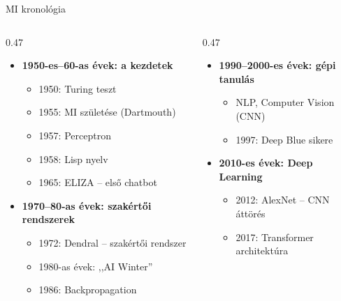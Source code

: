 \documentclass[aspectratio=169, 12pt]{beamer}
\begin{document}
\begin{frame}{MI kronológia}
  \footnotesize
  \begin{columns}[T,onlytextwidth]
    \begin{column}{0.47\textwidth}
      \begin{itemize}\setlength{\itemsep}{1pt}
        \item \textbf{1950-es--60-as évek: a kezdetek}
          \begin{itemize}\setlength{\itemsep}{1pt}
            \item 1950: Turing teszt
            \item 1955: MI születése (Dartmouth)
            \item 1957: Perceptron
            \item 1958: Lisp nyelv
            \item 1965: ELIZA -- első chatbot
          \end{itemize}
        \item \textbf{1970--80-as évek: szakértői rendszerek}
          \begin{itemize}\setlength{\itemsep}{1pt}
            \item 1972: Dendral -- szakértői rendszer
            \item 1980-as évek: ,,AI Winter''
            \item 1986: Backpropagation
          \end{itemize}
      \end{itemize}
    \end{column}
    \begin{column}{0.47\textwidth}
      \begin{itemize}\setlength{\itemsep}{1pt}
        \item \textbf{1990--2000-es évek: gépi tanulás}
          \begin{itemize}\setlength{\itemsep}{1pt}
            \item NLP, Computer Vision (CNN)
            \item 1997: Deep Blue sikere
          \end{itemize}
        \item \textbf{2010-es évek: Deep Learning}
          \begin{itemize}\setlength{\itemsep}{1pt}
            \item 2012: AlexNet -- CNN áttörés
            \item 2017: Transformer architektúra
          \end{itemize}

\end{itemize}
\end{column}
\end{columns}
\end{frame}
\end{document}
